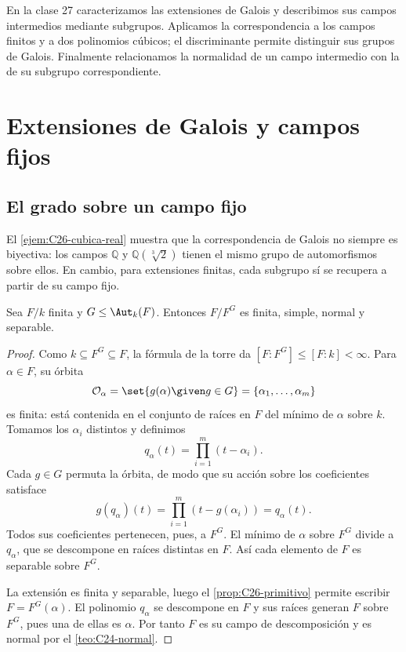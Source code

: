 En la clase 27 caracterizamos las extensiones de Galois y describimos sus campos intermedios mediante subgrupos. Aplicamos la correspondencia a los campos finitos y a dos polinomios cúbicos; el discriminante permite distinguir sus grupos de Galois. Finalmente relacionamos la normalidad de un campo intermedio con la de su subgrupo correspondiente.

\section{Extensiones de Galois y campos fijos}
\subsection{El grado sobre un campo fijo}
El \cref{ejem:C26-cubica-real} muestra que la correspondencia de Galois no siempre es biyectiva: los campos $\mathbb Q$ y $\mathbb Q(\sqrt[3]{2})$ tienen el mismo grupo de automorfismos sobre ellos. En cambio, para extensiones finitas, cada subgrupo sí se recupera a partir de su campo fijo.

\begin{lema}\label{lema:C27-campo-fijo}
Sea $F/k$ finita y $G\leq\Aut_k(F)$. Entonces $F/F^G$ es finita, simple, normal y separable.
\end{lema}
\begin{proof}
Como $k\subseteq F^G\subseteq F$, la fórmula de la torre da $[F:F^G]\leq[F:k]<\infty$. Para $\alpha\in F$, su órbita
\[
\mathcal O_\alpha=\set{g(\alpha)\given g\in G}=\{\alpha_1,\ldots,\alpha_m\}
\]
es finita: está contenida en el conjunto de raíces en $F$ del mínimo de $\alpha$ sobre $k$. Tomamos los $\alpha_i$ distintos y definimos
\[
q_\alpha(t)=\prod_{i=1}^m(t-\alpha_i).
\]
Cada $g\in G$ permuta la órbita, de modo que su acción sobre los coeficientes satisface
\[
g(q_\alpha)(t)=\prod_{i=1}^m(t-g(\alpha_i))=q_\alpha(t).
\]
Todos sus coeficientes pertenecen, pues, a $F^G$. El mínimo de $\alpha$ sobre $F^G$ divide a $q_\alpha$, que se descompone en raíces distintas en $F$. Así cada elemento de $F$ es separable sobre $F^G$.

La extensión es finita y separable, luego el \cref{prop:C26-primitivo} permite escribir $F=F^G(\alpha)$. El polinomio $q_\alpha$ se descompone en $F$ y sus raíces generan $F$ sobre $F^G$, pues una de ellas es $\alpha$. Por tanto $F$ es su campo de descomposición y es normal por el \cref{teo:C24-normal}.
\end{proof}

